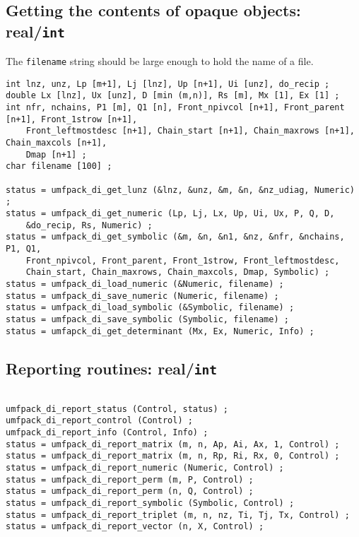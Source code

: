 \documentclass[11pt]{article}
\begin{document}
\subsection{Getting the contents of opaque objects: real/{\tt int}}

The {\tt filename} string should be large enough to hold the name of a file.

{\footnotesize
\begin{verbatim}
int lnz, unz, Lp [m+1], Lj [lnz], Up [n+1], Ui [unz], do_recip ;
double Lx [lnz], Ux [unz], D [min (m,n)], Rs [m], Mx [1], Ex [1] ;
int nfr, nchains, P1 [m], Q1 [n], Front_npivcol [n+1], Front_parent [n+1], Front_1strow [n+1],
    Front_leftmostdesc [n+1], Chain_start [n+1], Chain_maxrows [n+1], Chain_maxcols [n+1],
    Dmap [n+1] ;
char filename [100] ;

status = umfpack_di_get_lunz (&lnz, &unz, &m, &n, &nz_udiag, Numeric) ;
status = umfpack_di_get_numeric (Lp, Lj, Lx, Up, Ui, Ux, P, Q, D,
    &do_recip, Rs, Numeric) ;
status = umfpack_di_get_symbolic (&m, &n, &n1, &nz, &nfr, &nchains, P1, Q1,
    Front_npivcol, Front_parent, Front_1strow, Front_leftmostdesc,
    Chain_start, Chain_maxrows, Chain_maxcols, Dmap, Symbolic) ;
status = umfpack_di_load_numeric (&Numeric, filename) ;
status = umfpack_di_save_numeric (Numeric, filename) ;
status = umfpack_di_load_symbolic (&Symbolic, filename) ;
status = umfpack_di_save_symbolic (Symbolic, filename) ;
status = umfapck_di_get_determinant (Mx, Ex, Numeric, Info) ;
\end{verbatim}
}

\subsection{Reporting routines: real/{\tt int}}

{\footnotesize
\begin{verbatim}

umfpack_di_report_status (Control, status) ;
umfpack_di_report_control (Control) ;
umfpack_di_report_info (Control, Info) ;
status = umfpack_di_report_matrix (m, n, Ap, Ai, Ax, 1, Control) ;
status = umfpack_di_report_matrix (m, n, Rp, Ri, Rx, 0, Control) ;
status = umfpack_di_report_numeric (Numeric, Control) ;
status = umfpack_di_report_perm (m, P, Control) ;
status = umfpack_di_report_perm (n, Q, Control) ;
status = umfpack_di_report_symbolic (Symbolic, Control) ;
status = umfpack_di_report_triplet (m, n, nz, Ti, Tj, Tx, Control) ;
status = umfpack_di_report_vector (n, X, Control) ;
\end{verbatim}
}
\end{document}
